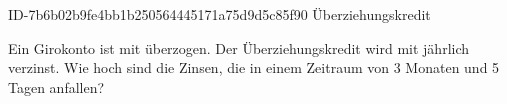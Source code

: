 \begin{exercise}
      {ID-7b6b02b9fe4bb1b250564445171a75d9d5c85f90}
      {Überziehungskredit}
  \ifproblem\problem\par
    Ein Girokonto ist mit  überzogen. Der Überziehungskredit wird
    mit  jährlich verzinst. Wie hoch sind die Zinsen, die in einem
    Zeitraum von \num{3} Monaten und \num{5} Tagen anfallen?
  \fi
\end{exercise}

